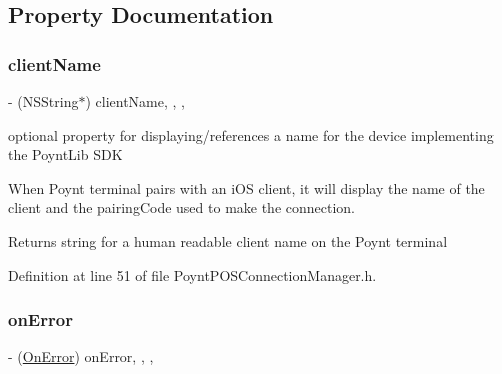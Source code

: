 \subsection{Property Documentation}
\hypertarget{interface_poynt_p_o_s_connection_manager_acc1c5e037cbbc59cd1b00f131660efe2}{}\label{interface_poynt_p_o_s_connection_manager_acc1c5e037cbbc59cd1b00f131660efe2} 
\subsubsection{\texorpdfstring{client\+Name}{clientName}}
{\footnotesize\ttfamily -\/ (N\+S\+String$\ast$) client\+Name\hspace{0.3cm}{\ttfamily [read]}, {\ttfamily [write]}, {\ttfamily [nonatomic]}, {\ttfamily [strong]}}



optional property for displaying/references a name for the device implementing the Poynt\+Lib S\+DK 

When Poynt terminal pairs with an i\+OS client, it will display the name of the client and the pairing\+Code used to make the connection.

\begin{DoxyReturn}{Returns}
string for a human readable client name on the Poynt terminal 
\end{DoxyReturn}


Definition at line 51 of file Poynt\+P\+O\+S\+Connection\+Manager.\+h.

\hypertarget{interface_poynt_p_o_s_connection_manager_a2ea439a383295e69bc2094a614e3b6fb}{}\label{interface_poynt_p_o_s_connection_manager_a2ea439a383295e69bc2094a614e3b6fb} 
\subsubsection{\texorpdfstring{on\+Error}{onError}}
{\footnotesize\ttfamily -\/ (\hyperlink{_poynt_p_o_s_connection_manager_8h_aef7c4526c1bcdb84233ca3d7f7074d5a}{On\+Error}) on\+Error\hspace{0.3cm}{\ttfamily [read]}, {\ttfamily [write]}, {\ttfamily [atomic]}, {\ttfamily [copy]}}



